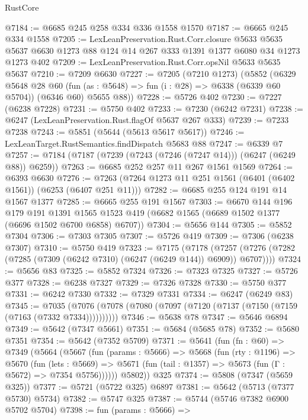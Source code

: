 \begin{lexlean}{RustCore}
\begin{coremodule}
@7184 := @6685 @245 @258 @334 @336 @1558 @1570
@7187 := @6665 @245 @334 @1558
@7205 := LexLeanPreservation.Rust.Corr.closure
    @5633
    @5635
    @5637
    @6630
    @1273
    @88
    @124
    @14
    @267
    @333
    @1391
    @1377
    @6080
    @34
    @1273
    @1273
    @402
@7209 := LexLeanPreservation.Rust.Corr.opsNil @5633 @5635 @5637
@7210 := @7209 @6630
@7227 := @7205
    (@7210 @1273)
    (@5852
      (@6329
        @5648
        @28
        @60
        (fun (as : @5648) => fun (i : @28) => @6338 (@6339 @60 @5704))
        (@6346 @60)
        @5655
        @88))
@7228 := @5726 @402
@7230 := @7227 (@6238 @7228)
@7231 := @5750 @402
@7233 := @7230 (@6242 @7231)
@7238 := @6247 (LexLeanPreservation.Rust.flagOf @5637 @267 @333)
@7239 := @7233 @7238
@7243 := @5851 (@5644 (@5613 @5617 @5617))
@7246 := LexLeanTarget.RustSemantics.findDispatch @5683 @88
@7247 := @6339 @7
@7257 := @7184 (@7187 (@7239 (@7243 (@7246 (@7247 @14))) (@6247 (@6249 @88)) @6259))
@7263 := @6685 @252 @257 @11 @267 @1561 @1569
@7264 := @6393 @6630
@7276 := @7263 (@7264 @1273 @11 @251 @1561 (@6401 (@6402 @1561)) (@6253 (@6407 @251 @11)))
@7282 := @6685 @255 @124 @191 @14 @1567 @1377
@7285 := @6665 @255 @191 @1567
@7303 := @6670
    @144
    @196
    @179
    @191
    @1391
    @1565
    @1523
    @419
    (@6682 @1565 (@6689 @1502 @1377 (@6696 @1502 @6700 @6858) @6707))
@7304 := @5656 @144
@7305 := @5852 @7304
@7306 := @7303 @7305
@7307 := @5726 @419
@7309 := @7306 (@6238 @7307)
@7310 := @5750 @419
@7323 := @7175
    (@7178 (@7257 (@7276 (@7282 (@7285 (@7309 (@6242 @7310) (@6247 (@6249 @144)) @6909)) @6707))))
@7324 := @5656 @83
@7325 := @5852 @7324
@7326 := @7323 @7325
@7327 := @5726 @377
@7328 := @6238 @7327
@7329 := @7326 @7328
@7330 := @5750 @377
@7331 := @6242 @7330
@7332 := @7329 @7331
@7334 := @6247 (@6249 @83)
@7345 := @7035 (@7076 (@7078 (@7080 (@7097 (@7120 (@7137 (@7150 (@7159 (@7163 (@7332 @7334))))))))))
@7346 := @5638 @78
@7347 := @5646 @6894
@7349 := @5642 (@7347 @5661)
@7351 := @5684 (@5685 @78)
@7352 := @5680 @7351
@7354 := @5642 (@7352 @5709)
@7371 := @5641
    (fun (fn : @60) =>
    @7349
      (@5664
        (@5667
          (fun (params : @5666) =>
          @5668
            (fun (rty : @1196) =>
            @5670
              (fun (lets : @5669) =>
              @5671 (fun (tail : @1357) => @5673 (fun (Γ : @5672) => @7354 @5756))))))
        @5802))
    @325
@7374 := @5808 (@7347 (@5659 @325))
@7377 := @5721 (@5722 @325) @6897
@7381 := @5642 (@5713 (@7377 @5730) @5734)
@7382 := @5747 @325
@7387 := @5744 (@5746 @7382 @6900 @5702 @5704)
@7398 := fun (params : @5666) =>

\end{coremodule}
\end{lexlean}
